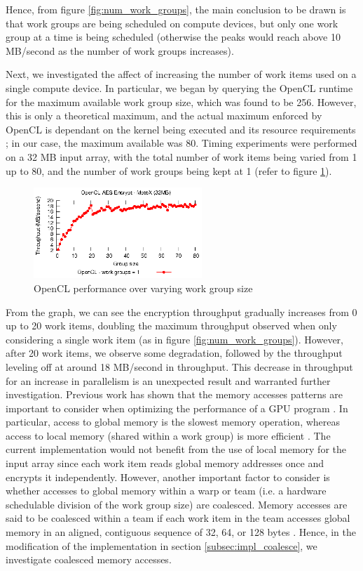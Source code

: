 \documentclass[conference,10pt]{IEEEtran}
\begin{document}
Hence, from figure \ref{fig:num_work_groups}, the main conclusion to be drawn is that work groups 
are being scheduled on compute devices, but only one work group at a time is being scheduled 
(otherwise the peaks would reach above 10 MB/second as the number of work groups increases).

Next, we investigated the affect of increasing the number of work items used on a single compute 
device.  In particular, we began by querying the OpenCL runtime for the maximum available work group 
size, which was found to be 256.  However, this is only a theoretical maximum, and the actual 
maximum enforced by OpenCL is dependant on the kernel being executed and its resource requirements 
\cite{opencl_guide}; in our case, the maximum available was 80.  Timing experiments were performed 
on a 32 MB input array, with the total number of work items being varied from 1 up to 80, and the 
number of work groups being kept at 1 (refer to figure \ref{fig:work_group_size}).

\begin{figure}[!t]
\centering
\includegraphics[width=2.5in]{../final/motox/4.2/sample_opencl_aes_work_group_size.32MB.1_work_groups.again.report.eps}
\caption{OpenCL performance over varying work group size}
\label{fig:work_group_size}
\end{figure}

From the graph, we can see the encryption throughput gradually increases from 0 up to 20 work items, 
doubling the maximum throughput observed when only considering a single work item (as in figure 
\ref{fig:num_work_groups}).  However, after 20 work items, we observe some degradation, followed by 
the throughput leveling off at around 18 MB/second in throughput.  This decrease in throughput for 
an increase in parallelism is an unexpected result and warranted further investigation.  Previous 
work has shown that the memory accesses patterns are important to consider when optimizing the 
performance of a GPU program \cite{gpu_mem}. In particular, access to global memory is the slowest 
memory operation, whereas access to local memory (shared within a work group) is more efficient 
\cite{opencl_guide}.  The current implementation would not benefit from the use of local memory for 
the input array since each work item reads global memory addresses once and encrypts it 
independently.  However, another important factor to consider is whether accesses to global memory 
within a warp \cite{gpu_mem} or team \cite{opencl_guide} (i.e. a hardware schedulable division of 
the work group size) are coalesced.  Memory accesses are said to be coalesced within a team if each 
work item in the team accesses global memory in an aligned, contiguous sequence of 32, 64, or 128 
bytes \cite{nvidia_opencl}. Hence, in the modification of the implementation in section 
\ref{subsec:impl_coalesce}, we investigate coalesced memory accesses.  
\end{document}
